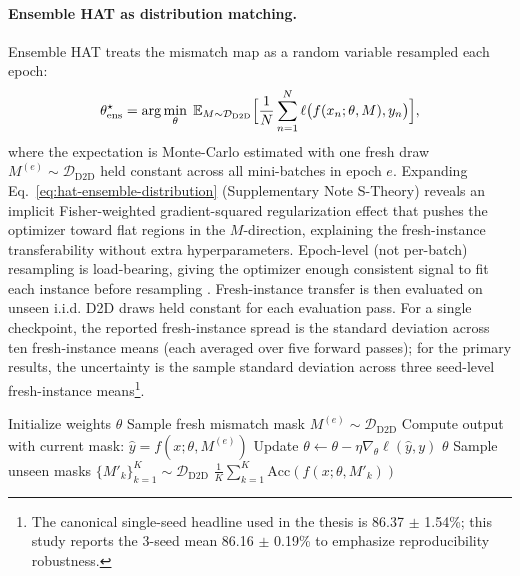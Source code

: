 \paragraph{Ensemble HAT as distribution matching.}
Ensemble HAT treats the mismatch map as a random variable resampled each epoch:
\begin{equation}
    \theta_{\text{ens}}^{\star} = \arg\min_{\theta}\;\mathbb{E}_{M\sim\mathcal{D}_{\text{D2D}}}\Bigl[\frac{1}{N}\sum_{n=1}^{N}\ell\bigl(f(x_n;\theta,M),y_n\bigr)\Bigr],
    \label{eq:hat-ensemble-distribution}
\end{equation}
where the expectation is Monte-Carlo estimated with one fresh draw $M^{(e)}\sim\mathcal{D}_{\text{D2D}}$ held constant across all mini-batches in epoch $e$. Expanding Eq.~\ref{eq:hat-ensemble-distribution} (Supplementary Note S-Theory) reveals an implicit Fisher-weighted gradient-squared regularization effect that pushes the optimizer toward flat regions in the $M$-direction, explaining the fresh-instance transferability without extra hyperparameters. Epoch-level (not per-batch) resampling is load-bearing, giving the optimizer enough consistent signal to fit each instance before resampling \citep{tobin2017domain}. Fresh-instance transfer is then evaluated on unseen i.i.d. D2D draws held constant for each evaluation pass. For a single checkpoint, the reported fresh-instance spread is the standard deviation across ten fresh-instance means (each averaged over five forward passes); for the primary results, the uncertainty is the sample standard deviation across three seed-level fresh-instance means\footnote{The canonical single-seed headline used in the thesis is 86.37 $\pm$ 1.54\%; this study reports the 3-seed mean 86.16 $\pm$ 0.19\% to emphasize reproducibility robustness.}.

\begin{algorithm}[H]
\caption{Ensemble Hardware-Aware Training (HAT)}
\label{alg:ensemble-hat}
\begin{algorithmic}[1]
    \State Initialize weights $\theta$
        \State Sample fresh mismatch mask $M^{(e)} \sim \mathcal{D}_{\text{D2D}}$
            \State Compute output with current mask: $\hat{y} = f(x; \theta, M^{(e)})$
            \State Update $\theta \leftarrow \theta - \eta \nabla_{\theta} \ell(\hat{y}, y)$
        \EndFor
    \EndFor
    \State \Return $\theta$
\EndProcedure
{}
    \State Sample unseen masks $\{M'_{k}\}_{k=1}^K \sim \mathcal{D}_{\text{D2D}}$
    \State \Return $\frac{1}{K} \sum_{k=1}^K \text{Acc}(f(x; \theta, M'_k))$
\EndProcedure
\end{algorithmic}
\end{algorithm}


